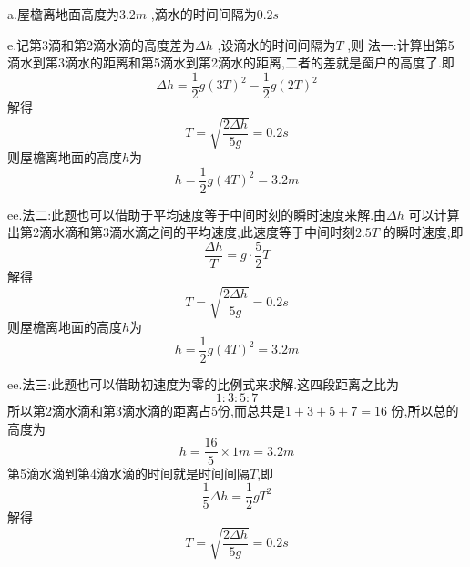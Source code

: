\begin{calculate}
a.屋檐离地面高度为$3.2m$ ,滴水的时间间隔为$0.2s$

e.记第3滴和第2滴水滴的高度差为$\Delta h$ ,设滴水的时间间隔为$T$ ,则
法一:计算出第5滴水到第3滴水的距离和第5滴水到第2滴水的距离,二者的差就是窗户的高度了.即
$$\Delta h=\frac{1}{2}g(3T)^2-\frac{1}{2}g(2T)^2$$
解得
$$T=\sqrt{\frac{2\Delta h}{5g}}=0.2s$$
则屋檐离地面的高度$h$为
$$h=\frac{1}{2}g(4T)^2=3.2m$$

ee.法二:此题也可以借助于平均速度等于中间时刻的瞬时速度来解.由$\Delta h$ 可以计算出第2滴水滴和第3滴水滴之间的平均速度,此速度等于中间时刻$2.5T$ 的瞬时速度,即
$$\frac{\Delta h}{T}=g\cdot \frac{5}{2}T$$
解得
$$T=\sqrt{\frac{2\Delta h}{5g}}=0.2s$$
则屋檐离地面的高度$h$为
$$h=\frac{1}{2}g(4T)^2=3.2m$$

ee.法三:此题也可以借助初速度为零的比例式来求解.这四段距离之比为
$$1:3:5:7$$
所以第2滴水滴和第3滴水滴的距离占5份,而总共是$1+3+5+7=16$ 份,所以总的高度为
$$h=\frac{16}{5}\times 1m=3.2m$$
第5滴水滴到第4滴水滴的时间就是时间间隔$T$,即
$$\frac{1}{5}\Delta h=\frac{1}{2}gT^2$$
解得
$$T=\sqrt{\frac{2\Delta h}{5g}}=0.2s$$



\end{calculate}


